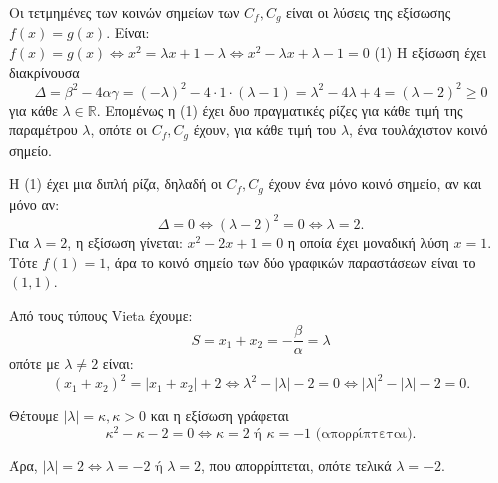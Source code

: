 
\begin{alist}
\item Οι τετμημένες των κοινών σημείων των $C_f, C_g$ είναι οι λύσεις της εξίσωσης $f(x) = g(x)$. Είναι:
$f(x) = g(x) \Leftrightarrow x^2 = \lambda x + 1 - \lambda \Leftrightarrow x^2 - \lambda x + \lambda - 1 = 0$ (1)
Η εξίσωση έχει διακρίνουσα
\[\Delta = \beta^2 - 4\alpha\gamma = (-\lambda)^2 - 4 \cdot 1 \cdot (\lambda - 1) = \lambda^2 - 4\lambda + 4 = (\lambda - 2)^2 \ge 0\]
για κάθε $\lambda \in \mathbb{R}$.
Επομένως η (1) έχει δυο πραγματικές ρίζες για κάθε τιμή της παραμέτρου $\lambda$, οπότε οι $C_f, C_g$ έχουν, για κάθε τιμή του $\lambda$, ένα τουλάχιστον κοινό σημείο.

\item Η (1) έχει μια διπλή ρίζα, δηλαδή οι $C_f, C_g$ έχουν ένα μόνο κοινό σημείο, αν και μόνο αν:
\[\Delta = 0 \Leftrightarrow (\lambda - 2)^2 = 0 \Leftrightarrow \lambda = 2.\]
Για $\lambda = 2$, η εξίσωση γίνεται:
$x^2 - 2x + 1 = 0$
η οποία έχει μοναδική λύση $x = 1$.
Τότε $f(1) = 1$, άρα το κοινό σημείο των δύο γραφικών παραστάσεων είναι το $(1, 1)$.

\item Από τους τύπους Vieta έχουμε:
\[S = x_1 + x_2 = -\dfrac{\beta}{\alpha} = \lambda\]
οπότε με $\lambda \ne 2$ είναι:
\[(x_1 + x_2)^2 = |x_1 + x_2| + 2 \Leftrightarrow \lambda^2 - |\lambda| - 2 = 0 \Leftrightarrow |\lambda|^2 - |\lambda| - 2 = 0.\]

Θέτουμε $|\lambda| = \kappa, \kappa > 0$ και η εξίσωση γράφεται
\[\kappa^2 - \kappa - 2 = 0 \Leftrightarrow \kappa = 2 \text{ ή } \kappa = -1 \text{ (απορρίπτεται)}.\]

Άρα, $|\lambda| = 2 \Leftrightarrow \lambda = -2 \text{ ή } \lambda = 2$, που απορρίπτεται, οπότε τελικά $\lambda = -2$.
\end{alist}

